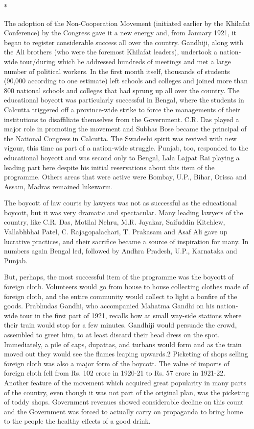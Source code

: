 \begin{center}*\end{center}



The adoption of the Non-Cooperation Movement (initiated earlier by the Khilafat Conference) by the Congress gave it a new energy and, from January 1921, it began to register considerable success all over the country. Gandhiji, along with the Ali brothers (who were the foremost Khilafat leaders), undertook a nation­ wide tour/during which he addressed hundreds of meetings and met a large number of political workers. In the first month itself, thousands of students (90,000 according to one estimate) left schools and colleges and joined more than 800 national schools and colleges that had sprung up all over the country. The educational boycott was particularly successful in Bengal, where the students in Calcutta triggered off a province-wide strike to force the managements of their institutions to disaffiliate themselves from the Government. C.R. Das played a major role in promoting the movement and Subhas Bose became the principal of the National Congress in Calcutta. The Swadeshi spirit was revived with new vigour, this time as part of a nation-wide struggle. Punjab, too, responded to the educational boycott and was second only to Bengal, Lala Lajpat Rai playing a leading part here despite his initial reservations about this item of the programme. Others areas that were active were Bombay, U.P., Bihar, Orissa and Assam, Madras remained lukewarm. 

The boycott of law courts by lawyers was not as successful as the educational boycott, but it was very dramatic and spectacular. Many leading lawyers of the country, like C.R. Das, Motilal Nehru, M.R. Jayakar, Saifuddin Kitchlew, Vallabhbhai Patel, C. Rajagopalachari, T. Prakasam and Asaf Ali gave up lucrative practices, and their sacrifice became a source of inspiration for many. In numbers again Bengal led, followed by Andhra Pradesh, U.P., Karnataka and Punjab. 

But, perhaps, the most successful item of the programme was the boycott of foreign cloth. Volunteers would go from house to house collecting clothes made of foreign cloth, and the entire community would collect to light a bonfire of the goods. Prabhudas Gandhi, who accompanied Mahatma Gandhi on his nation-wide tour in the first part of 1921, recalls how at small way-side stations where their train would stop for a few minutes. Gandhiji would persuade the crowd, assembled to greet him, to at least discard their head dress on the spot. Immediately, a pile of caps, dupattas, and turbans would form and as the train moved out they would see the flames leaping upwards.2 Picketing of shops selling foreign cloth was also a major form of the boycott. The value of imports of foreign cloth fell from Rs. 102 crore in 1920-21 to Rs. 57 crore in 1921-22. Another feature of the movement which acquired great popularity in many parts of the country, even though it was not part of the original plan, was the picketing of toddy shops. Government revenues showed considerable decline on this count and the Government was forced to actually carry on propaganda to bring home to the people the healthy effects of a good drink. 

